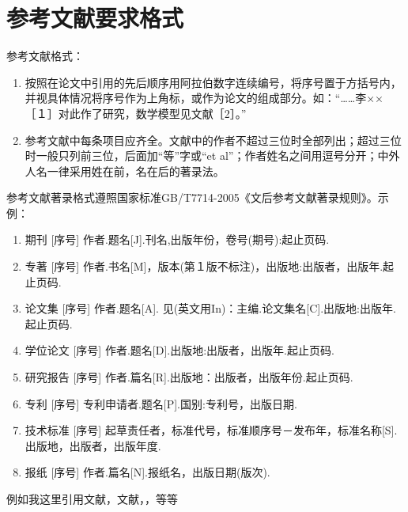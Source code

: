 \chapter{参考文献要求格式}

参考文献格式：
\begin{enumerate}[label=\arabic*.~~]
    \item 按照在论文中引用的先后顺序用阿拉伯数字连续编号，将序号置于方括号内，并视具体情况将序号作为上角标，或作为论文的组成部分。如：“……李××［１］对此作了研究，数学模型见文献［2］。” 
    \item 参考文献中每条项目应齐全。文献中的作者不超过三位时全部列出；超过三位时一般只列前三位，后面加“等”字或“et al”；作者姓名之间用逗号分开；中外人名一律采用姓在前，名在后的著录法。
\end{enumerate}

参考文献著录格式遵照国家标准GB/T7714-2005《文后参考文献著录规则》。示例：
\begin{enumerate}[label=（\arabic*）]
    \item 期刊
    [序号] 作者.题名[J].刊名,出版年份，卷号(期号):起止页码.
    \item 专著
    [序号] 作者.书名[M]，版本(第１版不标注)，出版地:出版者，出版年.起止页码.
    \item 论文集
    [序号] 作者.题名[A]. 见(英文用In)：主编.论文集名[C].出版地:出版年.起止页码.
    \item 学位论文
    [序号] 作者.题名[D].出版地:出版者，出版年.起止页码.
    \item 研究报告
    [序号] 作者.篇名[R].出版地：出版者，出版年份.起止页码.
    \item 专利
    [序号] 专利申请者.题名[P].国别:专利号，出版日期.
    \item 技术标准
    [序号] 起草责任者，标准代号，标准顺序号－发布年，标准名称[S].出版地，出版者，出版年度.
    \item 报纸
    [序号] 作者.篇名[N].报纸名，出版日期(版次).
\end{enumerate}

例如我这里引用文献\cite{2001Applying}，文献\cite{2004PSO_ZhangLibiao}，\cite{2005Improve_JinYixiong}，\cite{2021A}等等

